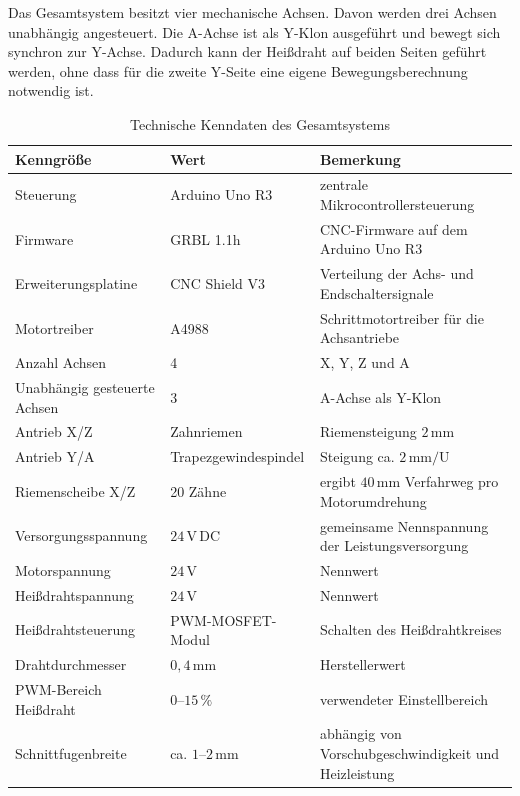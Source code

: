 Das Gesamtsystem besitzt vier mechanische Achsen. Davon werden drei Achsen unabhängig angesteuert. Die A-Achse ist als Y-Klon ausgeführt und bewegt sich synchron zur Y-Achse. Dadurch kann der Heißdraht auf beiden Seiten geführt werden, ohne dass für die zweite Y-Seite eine eigene Bewegungsberechnung notwendig ist.

\begin{table}[H]
	\centering
	\caption{Technische Kenndaten des Gesamtsystems}
	\label{tab:technische_kenndaten_gesamtsystem}
	\begin{tabular}{p{5cm} p{4cm} p{6cm}}
		\hline
		\textbf{Kenngröße} & \textbf{Wert} & \textbf{Bemerkung} \\
		\hline
		Steuerung & Arduino Uno R3 & zentrale Mikrocontrollersteuerung \\
		Firmware & GRBL 1.1h & CNC-Firmware auf dem Arduino Uno R3 \\
		Erweiterungsplatine & CNC Shield V3 & Verteilung der Achs- und Endschaltersignale \\
		Motortreiber & A4988 & Schrittmotortreiber für die Achsantriebe \\
		Anzahl Achsen & 4 & X, Y, Z und A \\
		Unabhängig gesteuerte Achsen & 3 & A-Achse als Y-Klon \\
		Antrieb X/Z & Zahnriemen & Riemensteigung \(2\,\mathrm{mm}\) \\
		Antrieb Y/A & Trapezgewindespindel & Steigung ca. \(2\,\mathrm{mm/U}\) \\
		Riemenscheibe X/Z & 20 Zähne & ergibt \(40\,\mathrm{mm}\) Verfahrweg pro Motorumdrehung \\
		Versorgungsspannung & \(24\,\mathrm{V}\,\mathrm{DC}\) & gemeinsame Nennspannung der Leistungsversorgung \\
		Motorspannung & \(24\,\mathrm{V}\) & Nennwert \\
		Heißdrahtspannung & \(24\,\mathrm{V}\) & Nennwert \\
		Heißdrahtsteuerung & PWM-MOSFET-Modul & Schalten des Heißdrahtkreises \\
		Drahtdurchmesser & \(0{,}4\,\mathrm{mm}\) & Herstellerwert \\
		PWM-Bereich Heißdraht & \(0\)--\(15\,\%\) & verwendeter Einstellbereich \\
		Schnittfugenbreite & ca. \(1\)--\(2\,\mathrm{mm}\) & abhängig von Vorschubgeschwindigkeit und Heizleistung \\
		\hline
	\end{tabular}
\end{table}

